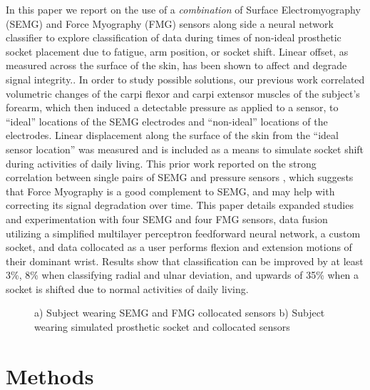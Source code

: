 \documentclass[twocolumn]{sagej}
\begin{document}
In this paper we report on the use of a \textit{combination} of Surface Electromyography (SEMG) and Force Myography (FMG) sensors along side a neural network classifier to explore classification of data during times of non-ideal prosthetic socket placement due to fatigue, arm position, or socket shift.  Linear offset, as measured across the surface of the skin, has been shown to affect and degrade signal integrity.\cite{Hargrove2006b, AsghariOskoei2007b}. In order to study possible solutions, our previous work\cite{SanfordSPIE2015a} correlated volumetric changes of the carpi flexor and carpi extensor muscles of the subject's forearm, which then induced a detectable pressure as applied to a sensor, to ``ideal'' locations of the SEMG electrodes and ``non-ideal'' locations of the electrodes.  Linear displacement along the surface of the skin from the ``ideal sensor location'' was measured and is included as a means to simulate socket shift during activities of daily living.  This prior work reported on the strong correlation between single pairs of SEMG and pressure sensors \cite{SanfordSPIE2015a}, which suggests that Force Myography is a good complement to SEMG, and may help with correcting its signal degradation over time. This paper details expanded studies and experimentation with four SEMG and four FMG sensors, data fusion utilizing a simplified multilayer perceptron feedforward neural network, a custom socket, and data collocated as a user performs flexion and extension motions of their dominant wrist.  Results show that classification can be improved by at least 3\%, 8\% when classifying radial and ulnar deviation, and upwards of 35\% when a socket is shifted due to normal activities of daily living. \par \noindent

\begin{figure}[htbp]
\centering
{}
 \caption{a) Subject wearing SEMG and FMG collocated sensors b) Subject wearing simulated prosthetic socket and collocated sensors}

\end{figure}

\section*{Methods}
\label{sec:methods}
\end{document}
